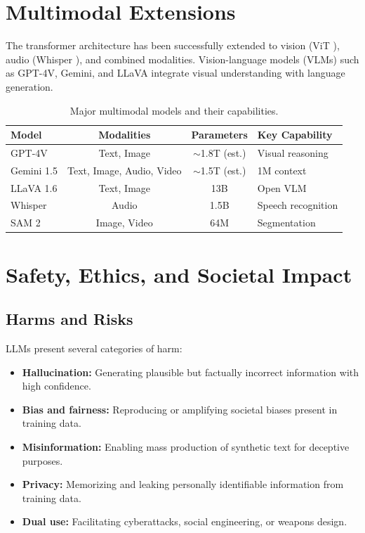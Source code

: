 \documentclass[
    language=english,
    doctype=review-article,
    institution=none,
]{../../omnilatex}
\begin{document}
\section{Multimodal Extensions}
\label{sec:multimodal}

The transformer architecture has been successfully extended to vision
(ViT \cite{dosovitskiy2020image}), audio (Whisper \cite{radford2023robust}),
and combined modalities. Vision-language models (VLMs) such as GPT-4V,
Gemini, and LLaVA integrate visual understanding with language generation.

\begin{table}[htbp]
    \centering
    \caption{Major multimodal models and their capabilities.}
    \label{tab:multimodal}
    \begin{tabular}{@{}lccl@{}}
        \toprule
        Model & Modalities & Parameters & Key Capability \\
        \midrule
        GPT-4V & Text, Image & $\sim$1.8T (est.) & Visual reasoning \\
        Gemini 1.5 & Text, Image, Audio, Video & $\sim$1.5T (est.) & 1M context \\
        LLaVA 1.6 & Text, Image & 13B & Open VLM \\
        Whisper & Audio & 1.5B & Speech recognition \\
        SAM 2 & Image, Video & 64M & Segmentation \\
        \bottomrule
    \end{tabular}
\end{table}

\section{Safety, Ethics, and Societal Impact}
\label{sec:safety}

\subsection{Harms and Risks}

LLMs present several categories of harm:
\begin{itemize}
    \item \textbf{Hallucination:} Generating plausible but factually incorrect
          information with high confidence.
    \item \textbf{Bias and fairness:} Reproducing or amplifying societal biases
          present in training data.
    \item \textbf{Misinformation:} Enabling mass production of synthetic text
          for deceptive purposes.
    \item \textbf{Privacy:} Memorizing and leaking personally identifiable
          information from training data.
    \item \textbf{Dual use:} Facilitating cyberattacks, social engineering,
          or weapons design.
\end{itemize}
\end{document}
